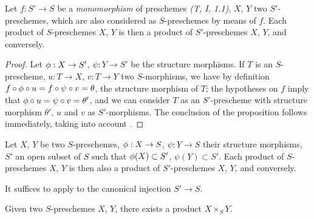 \begin{prop}[3.2.4]
\label{1.3.2.4}
Let $f:S'\to S$ be a \emph{monomorphism} of preschemes \emph{(T, I, 1.1)}, $X$, $Y$ two
$S'$-preschemes, which are also considered as $S$-preschemes by means of $f$. Each product of
$S$-preschemes $X$, $Y$ is then a product of $S'$-preschemes $X$, $Y$, and conversely.
\end{prop}

\begin{proof}
\label{proof-1.3.2.4}
Let $\vphi:X\to S'$, $\psi:Y\to S'$ be the structure morphisms. If $T$ is an $S$-prescheme,
$u:T\to X$, $v:T\to Y$ two $S$-morphisms, we have by definition
$f\circ\phi\circ u=f\circ\psi\circ v=\theta$, the structure morphism of $T$; the hypotheses
on $f$ imply that $\phi\circ u=\psi\circ v=\theta'$, and we can consider $T$ as an
$S'$-prescheme with structure morphism $\theta'$, $u$ and $v$ as $S'$-morphisms. The
conclusion of the proposition follows immediately, taking into account .
\end{proof}

\begin{cor}[3.2.5]
\label{1.3.2.5}
Let $X$, $Y$ be two $S$-preschemes, $\vphi:X\to S$, $\psi:Y\to S$ their structure morphisms,
$S'$ an open subset of $S$ such that $\phi(X)\subset S'$, $\psi(Y)\subset S'$. Each product
of $S$-preschemes $X$, $Y$ is then also a product of $S'$-preschemes $X$, $Y$, and
conversely.
\end{cor}

It suffices to apply  to the canonical injection $S'\to S$.

\begin{thm}[3.2.6]
\label{1.3.2.6}
Given two $S$-preschemes $X$, $Y$, there exists a product $X\times_S Y$.
\end{thm}

